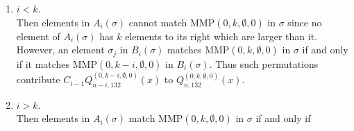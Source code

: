 \documentclass[
final,nomarks
]{dmtcs-episciences}
\newcommand{\Qmmn}[2]{Q_{#2,132}^{(#1)}(x)}
\newcommand{\MMP}{\mathrm{MMP}}
\begin{document}
\begin{enumerate}[{\bf Case }\bf 1.]
\item \begin{math}i < k\end{math}.\\
Then elements in 
\begin{math}A_i(\sigma)\end{math} cannot match \begin{math}\MMP(0,k,\emptyset,0)\end{math} in \begin{math}\sigma\end{math} since no element 
of \begin{math}A_i(\sigma)\end{math} has \begin{math}k\end{math} elements to its right which are larger than it. However, an 
element \begin{math}\sigma_j\end{math} in \begin{math}B_i(\sigma)\end{math}  matches \begin{math}\MMP(0,k,\emptyset,0)\end{math} in \begin{math}\sigma\end{math} if and only 
if it matches \begin{math}\MMP(0,k-i,\emptyset,0)\end{math} in \begin{math}B_i(\sigma)\end{math}. Thus such permutations 
contribute \begin{math}C_{i-1}\Qmmn{0,k-i,\emptyset,0}{n-i}\end{math} to \begin{math}\Qmmn{0,k,\emptyset,0}{n}\end{math}. 
\item \begin{math}i> k\end{math}.\\
Then elements in 
\begin{math}A_i(\sigma)\end{math} match \begin{math}\MMP(0,k,\emptyset,0)\end{math} in \begin{math}\sigma\end{math} if and only if 

\end{enumerate}
\end{document}
